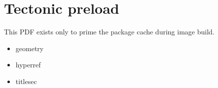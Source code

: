 \documentclass[11pt,letterpaper]{article}
\begin{document}
\section*{Tectonic preload}
This PDF exists only to prime the package cache during image build.
\begin{itemize}[leftmargin=*]
    \item geometry
    \item hyperref
    \item titlesec
\end{itemize}
\end{document}
